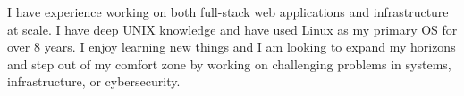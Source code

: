 

\begin{cvparagraph}

  I have experience working on both full-stack web applications and infrastructure at scale. I have deep UNIX knowledge and have used Linux as my primary OS for over 8 years. I enjoy learning new things and I am looking to expand my horizons and step out of my comfort zone by working on challenging problems in systems, infrastructure, or cybersecurity.
\end{cvparagraph}

